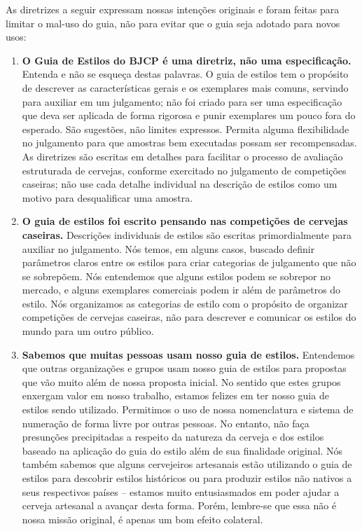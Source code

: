 As diretrizes a seguir expressam nossas intenções originais e foram feitas para limitar o mal-uso do guia, não para evitar que o guia seja adotado para novos usos:
\begin{enumerate}
\item \textbf{O Guia de Estilos do BJCP é uma diretriz, não uma especificação.} Entenda e não se esqueça destas palavras. O guia de estilos tem o propósito de descrever as características gerais e os exemplares mais comuns, servindo para auxiliar em um julgamento; não foi criado para ser uma especificação que deva ser aplicada de forma rigorosa e punir exemplares um pouco fora do esperado. São sugestões, não limites expressos. Permita alguma flexibilidade no julgamento para que amostras bem executadas possam ser recompensadas. As diretrizes são escritas em detalhes para facilitar o processo de avaliação estruturada de cervejas, conforme exercitado no julgamento de competições caseiras; não use cada detalhe individual na descrição de estilos como um motivo para desqualificar uma amostra.
\item \textbf{O guia de estilos foi escrito pensando nas competições de cervejas caseiras.} Descrições individuais de estilos são escritas primordialmente para auxiliar no julgamento. Nós temos, em alguns casos, buscado definir parâmetros claros entre os estilos para criar categorias de julgamento que não se sobrepõem. Nós entendemos que alguns estilos podem se sobrepor no mercado, e alguns exemplares comerciais podem ir além de parâmetros do estilo. Nós organizamos as categorias de estilo com o propósito de organizar competições de cervejas caseiras, não para descrever e comunicar os estilos do mundo para um outro público.
\item \textbf{Sabemos que muitas pessoas usam nosso guia de estilos.} Entendemos que outras organizações e grupos usam nosso guia de estilos para propostas que vão muito além de nossa proposta inicial. No sentido que estes grupos enxergam valor em nosso trabalho, estamos felizes em ter nosso guia de estilos sendo utilizado. Permitimos o uso de nossa nomenclatura e sistema de numeração de forma livre por outras pessoas. No entanto, não faça presunções precipitadas a respeito da natureza da cerveja e dos estilos baseado na aplicação do guia do estilo além de sua finalidade original. Nós também sabemos que alguns cervejeiros artesanais estão utilizando o guia de estilos para descobrir estilos históricos ou para produzir estilos não nativos a seus respectivos países – estamos muito entusiasmados em poder ajudar a cerveja artesanal a avançar desta forma. Porém, lembre-se que essa não é nossa missão original, é apenas um bom efeito colateral.

\end{enumerate}

